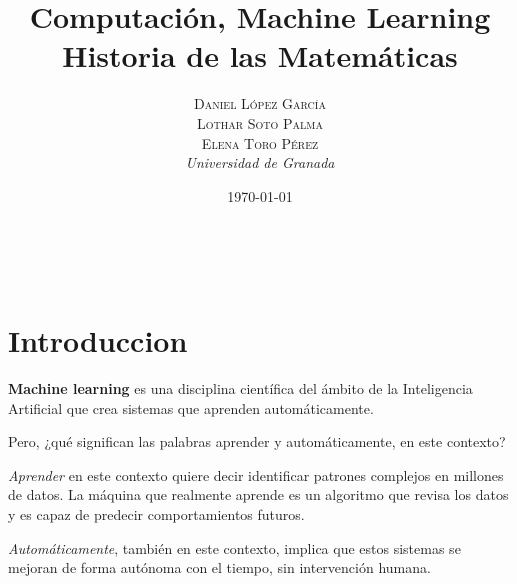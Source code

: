 \documentclass[a4paper, 11pt]{article} %
\title{\textbf{Computación, Machine Learning}\\ %
\vspace{20 pt}
Historia de las Matemáticas} %
\author{\textsc{Daniel López García\\
Lothar Soto Palma\\
Elena Toro Pérez} %
\\{\textit{Universidad de Granada}}} %
\date{\today} %
\makeatletter
\renewcommand{\maketitle}{ %
\begin{center} %
{\Huge\@title} %
\end{center}

\vspace{20pt} %

\begin{flushright} %
{\large\@author} %
\\\@date %

\vspace{40pt} %
\end{flushright}
\renewcommand{\baselinestretch}{0.5}

}
\makeatother
\begin{document}
	\maketitle
	\tableofcontents
	\listoffigures
	\newpage
\section{Introduccion}
\textbf{Machine learning} es una disciplina científica del ámbito de la Inteligencia Artificial que crea sistemas que aprenden automáticamente.

Pero, ¿qué significan las palabras aprender y automáticamente, en este contexto?

\textit{Aprender} en este contexto quiere decir identificar patrones complejos en millones de datos. La máquina que realmente aprende es un algoritmo que revisa los datos y es capaz de predecir comportamientos futuros. 

\textit{Automáticamente}, también en este contexto, implica que estos sistemas se mejoran de forma autónoma con el tiempo, sin intervención humana.
\end{document}
